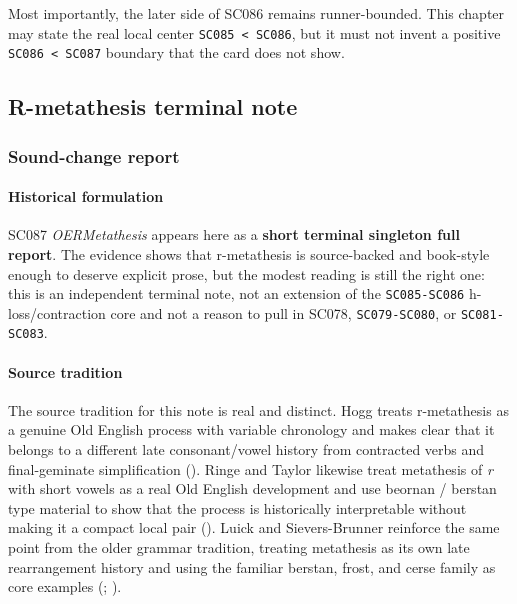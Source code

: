 \documentclass[
  british,
  a4paper,
]{article}
\begin{document}
Most importantly, the later side of SC086 remains runner-bounded. This
chapter may state the real local center
\texttt{SC085\ \textless{}\ SC086}, but it must not invent a positive
\texttt{SC086\ \textless{}\ SC087} boundary that the card does not show.

\subsection{R-metathesis terminal
note}\label{r-metathesis-terminal-note}

\subsubsection{Sound-change report}\label{sound-change-report-52}

\paragraph{Historical formulation}\label{historical-formulation-52}

SC087 \emph{OERMetathesis} appears here as a \textbf{short terminal
singleton full report}. The evidence shows that r-metathesis is
source-backed and book-style enough to deserve explicit prose, but the
modest reading is still the right one: this is an independent terminal
note, not an extension of the \texttt{SC085-SC086} h-loss/contraction
core and not a reason to pull in SC078, \texttt{SC079-SC080}, or
\texttt{SC081-SC083}.

\paragraph{Source tradition}\label{source-tradition-52}

The source tradition for this note is real and distinct. Hogg treats
r-metathesis as a genuine Old English process with variable chronology
and makes clear that it belongs to a different late consonant/vowel
history from contracted verbs and final-geminate simplification
(). Ringe and Taylor likewise treat
metathesis of \emph{r} with short vowels as a real Old English
development and use beornan / berstan type material to show that the
process is historically interpretable without making it a compact local
pair (). Luick and
Sievers-Brunner reinforce the same point from the older grammar
tradition, treating metathesis as its own late rearrangement history and
using the familiar berstan, frost, and cerse family as core examples
(;
).
\end{document}
